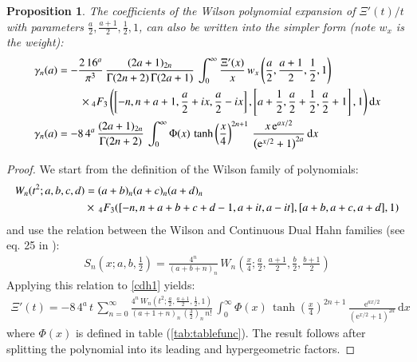\documentclass[a4paper,11pt,twoside]{amsart}
\newtheorem{proposition}[theorem]{Proposition}
\begin{document}
\begin{proposition}
The coefficients of the Wilson polynomial expansion of $\Xi'(t)/t$ with parameters $\frac{a}{2},\frac{a+1}{2},\frac12,1$, can also be written into the simpler form (note $w_x$ is the weight):   
\begin{align}
 \gamma_n(a) &=-\frac{2\,16^a}{\pi^3}\,\frac{(2a+1)_{2n}}{\Gamma(2n+2)\,\Gamma(2a+1)}\,\int_{0}^\infty \frac{\Xi'(x)}{x}\,w_x\left(\frac{a}{2},\frac{a+1}{2},\frac12,1\right) \,\\ &\qquad \times {}_4F_3\left(\left[-n,n+a+1,\frac{a}{2}+ix, \frac{a}{2}-ix\right],\left[a+\frac12,\frac{a}{2}+\frac12,\frac{a}{2}+1\right],1\right) \mathrm{d}x \notag \\
 \gamma_n(a) &=-8\,4^a\,\frac{(2a+1)_{2n}}{\Gamma(2n+2)}\,\int_{0}^\infty \Phi(x)\,\tanh\left(\frac{x}{4}\right)^{2n+1}\,\frac{x\,\mathrm{e}^{ax/2}}{\left(\mathrm{e}^{x/2}+1\right)^{2a}} \, \mathrm{d}x
\end{align}
\end{proposition}
\begin{proof}
We start from the definition of the Wilson family of polynomials:
\begin{align}
 W_n(t^2;a,b,c,d) &= (a+b)_n(a+c)_n(a+d)_n\, \\
  &\times\, {}_4F_3([-n, n+ a+b+c+d-1,a+it, a- it], [a+b, a+c, a+d], 1) \notag
\end{align}
and use the relation between the Wilson and Continuous Dual Hahn families (see eq. 25 in \cite{koesup}):
\begin{align}
 S_n\left(x;a,b,\frac12\right) = \frac{4^n}{(a+b+n)_n}\, W_n\left(\frac{x}{4};\frac{a}{2},\frac{a+1}{2},\frac{b}{2},\frac{b+1}{2}\right)
\end{align}
Applying this relation to \ref{cdh1} yields:
\begin{align}
  \Xi'(t)= -8\,4^a\,t\,\sum_{n=0}^\infty \frac{4^n\,W_n\left(t^2;\frac{a}{2},\frac{a+1}{2},\frac12,1\right)}{(a+1+n)_n\,\left(\frac32\right)_n\,n!}\,\int_{0}^{\infty} \Phi(x)\,\tanh\left(\frac{x}{4}\right)^{2n+1}\,\frac{\mathrm{e}^{ax/2}}{(\mathrm{e}^{x/2}+1)^{2a}}\,\mathrm{d}x
\end{align}
where $\Phi(x)$ is defined in table (\ref{tab:tablefunc}). The result follows after splitting the polynomial into its leading and hypergeometric factors.
\end{proof}
\end{document}
